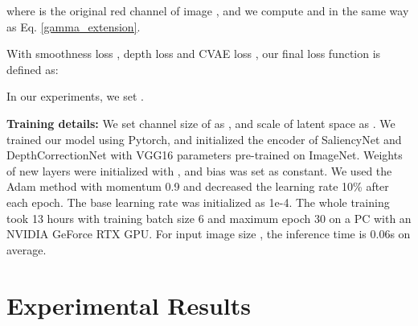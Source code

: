 \documentclass[10pt,twocolumn,letterpaper]{article}
\begin{document}
where  is the original red channel of image , and we compute  and  in the same way as Eq. \eqref{gamma_extension}.

With smoothness loss , depth loss  and CVAE loss , our final loss function is defined as:

In our experiments, we set .



\noindent\textbf{Training details:} We set channel size of  as , and scale of latent space as . We trained our model using Pytorch, and initialized the encoder of SaliencyNet and DepthCorrectionNet with VGG16 parameters pre-trained on ImageNet. Weights of new layers were initialized with , and bias was set as constant. We used the Adam method with momentum 0.9 and decreased the learning rate 10\% after each epoch. The base learning rate was initialized as 1e-4. The whole training took 13 hours with training batch size 6 and maximum epoch 30 on a PC with an NVIDIA GeForce RTX GPU. For input image size , the inference time is 0.06s on average.











\section{Experimental Results}
\end{document}
